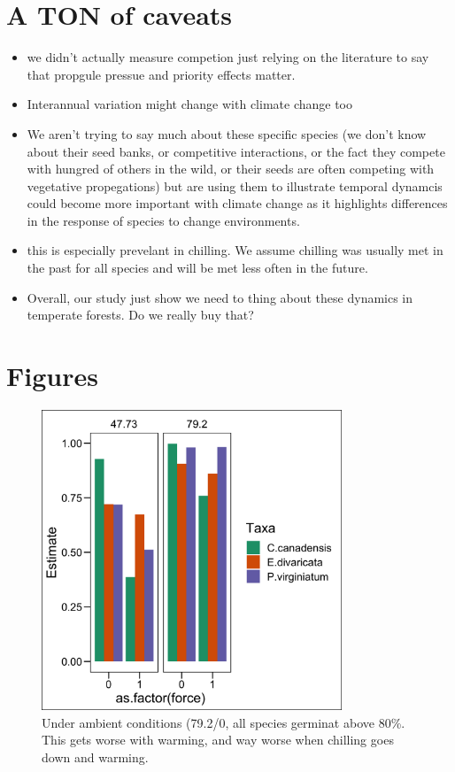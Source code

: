 \documentclass[11pt]{article}
\begin{document}
\section{A TON of caveats}
\begin{itemize}
\item we didn't actually measure competion just relying on the literature to say that propgule pressue and priority effects matter.
\item Interannual variation might change with climate change too
\item We aren't trying to say much about these specific species (we don't know about their seed banks, or competitive interactions, or the fact they compete with hungred of others in the wild, or their seeds are often competing with vegetative propegations) but are using them to illustrate temporal dynamcis could become more important with climate change as it highlights differences in the response of species to change environments.
\item this is especially prevelant in chilling. We assume chilling was usually met in the past for all species and will be met less often in the future. 
\item Overall, our study just show we need to thing about these dynamics in temperate forests. Do we really buy that?
\end{itemize}

\section{Figures}

\begin{figure}[h!]
        \centering
        \includegraphics[width=0.8\textwidth]{..//figures/germpercs.png}
          \caption{Under ambient conditions (79.2/0, all species germinat above 80\%. This gets worse with warming, and way worse when chilling goes down and warming.}
        \label{fig:germpercs}
    \end{figure}
\end{document}
